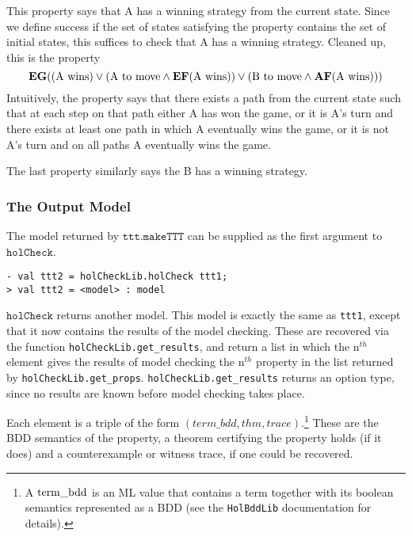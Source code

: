 This property says that A has a winning strategy from the current state. Since we define success if the set of states satisfying the property contains the set of initial states, this suffices to check that A has a winning strategy. Cleaned up, this is the \ctl property \[ \mathbf{EG} (\textup{(A wins)} \lor (\textup{A to move} \land \mathbf{EF} (\textup{A wins})) \lor (\textup{B to move} \land \mathbf{AF} (\textup{A wins})))\] Intuitively, the property says that there exists a path from the current state such that at each step on that path either A has won the game, or it is A's turn and there exists at least one path in which A eventually wins the game, or it is not A's turn and on all paths A eventually wins the game.

The last property similarly says the B has a winning strategy.

\subsubsection{The Output Model}

The model returned by \(\mathtt{ttt.makeTTT}\) can be supplied as the first argument to \(\mathtt{holCheck}\).

\begin{session}\begin{verbatim}
- val ttt2 = holCheckLib.holCheck ttt1;
> val ttt2 = <model> : model
\end{verbatim}\end{session}

\(\mathtt{holCheck}\) returns another model. This model is exactly the same as \texttt{ttt1}, except that it now contains the results of the model checking. These are recovered via the function \texttt{holCheckLib.get\_results}, and return a list in which the n\({}^{th}\) element gives the results of model checking the n\({}^{th}\) property in the list returned by \texttt{holCheckLib.get\_props}. \texttt{holCheckLib.get\_results} returns an option type, since no results are known before model checking takes place.

Each element is a triple of the form \( (term\_bdd,thm,trace) \).\footnote{A \(\textup{term\_bdd}\) is an ML value that contains a \HOL{} term together with its boolean semantics represented as a BDD (see the \texttt{HolBddLib} documentation for details).} These are the BDD semantics of the property, a theorem certifying the property holds (if it does) and a counterexample or witness trace, if one could be recovered.

